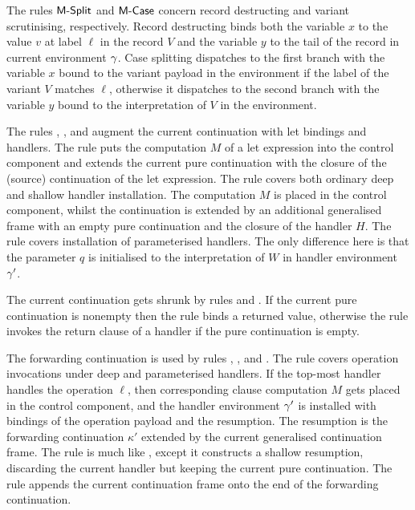 \documentclass[12pt,phd,lfcs,twoside,openright,logo,leftchapter,normalheadings]{infthesis}
\theoremstyle{plain}
\theoremstyle{definition}
\begin{document}
The rules $\mathsf{M\textrm{-}Split}$ and $\mathsf{M\textrm{-}Case}$ concern record destructing
and variant scrutinising, respectively. Record destructing binds both
the variable $x$ to the value $v$ at label $\ell$ in the record $V$
and the variable $y$ to the tail of the record in current environment
$\gamma$.
%
Case splitting dispatches to the first branch with the variable $x$
bound to the variant payload in the environment if the label of the
variant $V$ matches $\ell$, otherwise it dispatches to the second
branch with the variable $y$ bound to the interpretation of $V$ in the
environment.

The rules , , and 
augment the current continuation with let bindings and handlers. The
rule  puts the computation $M$ of a let expression into the
control component and extends the current pure continuation with the
closure of the (source) continuation of the let expression.
%
The  rule covers both ordinary deep and shallow
handler installation. The computation $M$ is placed in the control
component, whilst the continuation is extended by an additional
generalised frame with an empty pure continuation and the closure of
the handler $H$.
%
The rule  covers installation of parameterised
handlers. The only difference here is that the parameter $q$ is
initialised to the interpretation of $W$ in handler environment
$\gamma'$.

The current continuation gets shrunk by rules  and
. If the current pure continuation is nonempty then the
rule  binds a returned value, otherwise the rule
 invokes the return clause of a handler if the pure
continuation is empty.

The forwarding continuation is used by rules ,
, and . The rule 
covers operation invocations under deep and parameterised handlers. If
the top-most handler handles the operation $\ell$, then corresponding
clause computation $M$ gets placed in the control component, and the
handler environment $\gamma'$ is installed with bindings of the
operation payload and the resumption. The resumption is the forwarding
continuation $\kappa'$ extended by the current generalised
continuation frame.
%
The rule  is much like , except it
constructs a shallow resumption, discarding the current handler but
keeping the current pure continuation.
%
The rule  appends the current continuation
frame onto the end of the forwarding continuation.
\end{document}
